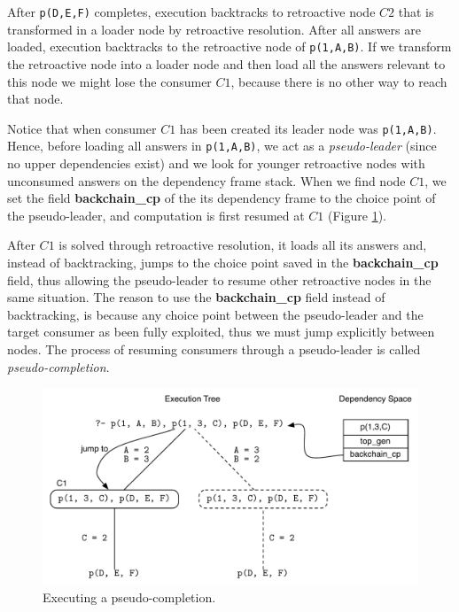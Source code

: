 After \texttt{p(D,E,F)} completes, execution backtracks to retroactive node $C2$ that is transformed
in a loader node by retroactive resolution. After all answers are loaded, execution backtracks to
the retroactive node of \texttt{p(1,A,B)}. If we transform the retroactive node into a loader node and
then load all the answers relevant to this node we might lose the consumer $C1$, because there is no
other way to reach that node.

Notice that when consumer $C1$ has been created its leader node was
\texttt{p(1,A,B)}. Hence, before loading all answers in \texttt{p(1,A,B)}, we act as a \textit{pseudo-leader}
(since no upper dependencies exist) and we look for younger retroactive nodes with unconsumed answers on the dependency
frame stack. When we find node $C1$, we set the field \textbf{backchain\_cp} of the its dependency
frame to the choice point of the pseudo-leader, and computation is first resumed at $C1$
(Figure \ref{fig:retro_pseudo_completion2}).

After $C1$ is solved through retroactive resolution, it loads all its answers and, instead of backtracking,
jumps to the choice point saved in the \textbf{backchain\_cp} field, thus allowing the pseudo-leader to resume
other retroactive nodes in the same situation. The reason to use the \textbf{backchain\_cp} field instead of
backtracking, is because any choice point between the pseudo-leader and the target consumer as been fully
exploited, thus we must jump explicitly between nodes. The process of resuming consumers through a pseudo-leader
is called \textit{pseudo-completion}.

\begin{figure}[ht]
  \centering
    \includegraphics[scale=0.6]{retro_pseudo_completion2.pdf}
  \caption{Executing a pseudo-completion.}
  \label{fig:retro_pseudo_completion2}
\end{figure}


